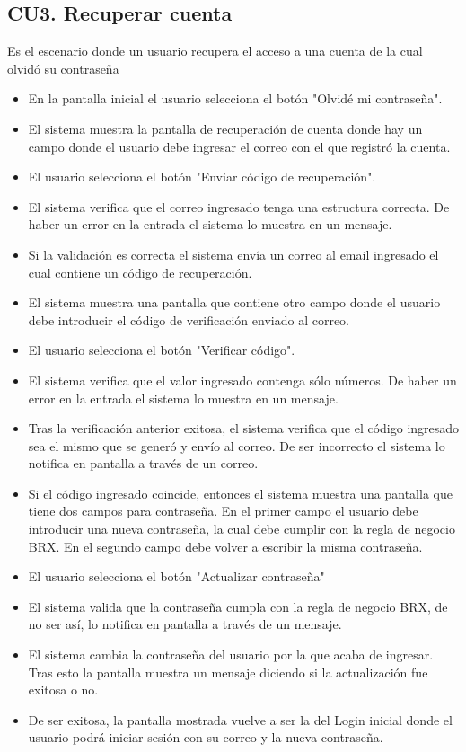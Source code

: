 \subsection{CU3. Recuperar cuenta}  \par
Es el escenario donde un usuario recupera el acceso a una cuenta de la cual olvidó su contraseña
\begin{itemize}
	\item En la pantalla inicial el usuario selecciona el botón "Olvidé mi contraseña".
	\item El sistema muestra la pantalla de recuperación de cuenta donde hay un campo donde el usuario debe ingresar el correo con el que registró la cuenta.
	\item El usuario selecciona el botón "Enviar código de recuperación".
	\item El sistema verifica que el correo ingresado tenga una estructura correcta. De haber un error en la entrada el sistema lo muestra en un mensaje.
	\item Si la validación es correcta el sistema envía un correo al email ingresado el cual contiene un código de recuperación.
	\item El sistema muestra una pantalla que contiene otro campo donde el usuario debe introducir el código de verificación enviado al correo.
	\item El usuario selecciona el botón "Verificar código".
	\item El sistema verifica que el valor ingresado contenga sólo números. De haber un error en la entrada el sistema lo muestra en un mensaje.
	\item Tras la verificación anterior exitosa, el sistema verifica que el código ingresado sea el mismo que se generó y envío al correo. De ser incorrecto el sistema lo notifica en pantalla a través de un correo.
	\item Si el código ingresado coincide, entonces el sistema muestra una pantalla que tiene dos campos para contraseña. En el primer campo el usuario debe introducir una nueva contraseña, la cual debe cumplir con la regla de negocio BRX. En el segundo campo debe volver a escribir la misma contraseña.
	\item El usuario selecciona el botón "Actualizar contraseña"
	\item El sistema valida que la contraseña cumpla con la regla de negocio BRX, de no ser así, lo notifica en pantalla a través de un mensaje.
	\item El sistema cambia la contraseña del usuario por la que acaba de ingresar. Tras esto la pantalla muestra un mensaje diciendo si la actualización fue exitosa o no.
	\item De ser exitosa, la pantalla mostrada vuelve a ser la del Login inicial donde el usuario podrá iniciar sesión con su correo y la nueva contraseña.
\end{itemize}

